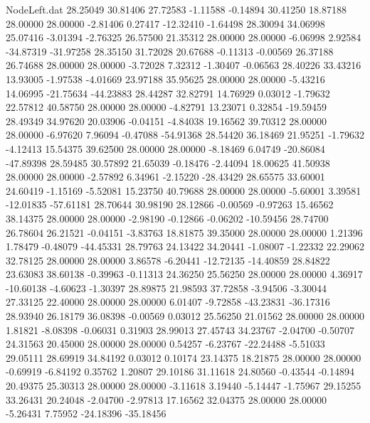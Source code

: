 \begin{filecontents}{NodeLeft.dat}
  28.25049   30.81406   27.72583    -1.11588   -0.14894   30.41250   18.87188   28.00000   28.00000   -2.81406    0.27417  -12.32410   -1.64498
  28.30094   34.06998   25.07416    -3.01394   -2.76325   26.57500   21.35312   28.00000   28.00000   -6.06998    2.92584  -34.87319  -31.97258
  28.35150   31.72028   20.67688    -0.11313   -0.00569   26.37188   26.74688   28.00000   28.00000   -3.72028    7.32312   -1.30407   -0.06563
  28.40226   33.43216   13.93005    -1.97538   -4.01669   23.97188   35.95625   28.00000   28.00000   -5.43216   14.06995  -21.75634  -44.23883
  28.44287   32.82791   14.76929     0.03012   -1.79632   22.57812   40.58750   28.00000   28.00000   -4.82791   13.23071    0.32854  -19.59459
  28.49349   34.97620   20.03906    -0.04151   -4.84038   19.16562   39.70312   28.00000   28.00000   -6.97620    7.96094   -0.47088  -54.91368
  28.54420   36.18469   21.95251    -1.79632   -4.12413   15.54375   39.62500   28.00000   28.00000   -8.18469    6.04749  -20.86084  -47.89398
  28.59485   30.57892   21.65039    -0.18476   -2.44094   18.00625   41.50938   28.00000   28.00000   -2.57892    6.34961   -2.15220  -28.43429
  28.65575   33.60001   24.60419    -1.15169   -5.52081   15.23750   40.79688   28.00000   28.00000   -5.60001    3.39581  -12.01835  -57.61181
  28.70644   30.98190   28.12866    -0.00569   -0.97263   15.46562   38.14375   28.00000   28.00000   -2.98190   -0.12866   -0.06202  -10.59456
  28.74700   26.78604   26.21521    -0.04151   -3.83763   18.81875   39.35000   28.00000   28.00000    1.21396    1.78479   -0.48079  -44.45331
  28.79763   24.13422   34.20441    -1.08007   -1.22332   22.29062   32.78125   28.00000   28.00000    3.86578   -6.20441  -12.72135  -14.40859
  28.84822   23.63083   38.60138    -0.39963   -0.11313   24.36250   25.56250   28.00000   28.00000    4.36917  -10.60138   -4.60623   -1.30397
  28.89875   21.98593   37.72858    -3.94506   -3.30044   27.33125   22.40000   28.00000   28.00000    6.01407   -9.72858  -43.23831  -36.17316
  28.93940   26.18179   36.08398    -0.00569    0.03012   25.56250   21.01562   28.00000   28.00000    1.81821   -8.08398   -0.06031    0.31903
  28.99013   27.45743   34.23767    -2.04700   -0.50707   24.31563   20.45000   28.00000   28.00000    0.54257   -6.23767  -22.24488   -5.51033
  29.05111   28.69919   34.84192     0.03012    0.10174   23.14375   18.21875   28.00000   28.00000   -0.69919   -6.84192    0.35762    1.20807
  29.10186   31.11618   24.80560    -0.43544   -0.14894   20.49375   25.30313   28.00000   28.00000   -3.11618    3.19440   -5.14447   -1.75967
  29.15255   33.26431   20.24048    -2.04700   -2.97813   17.16562   32.04375   28.00000   28.00000   -5.26431    7.75952  -24.18396  -35.18456

\end{filecontents}
